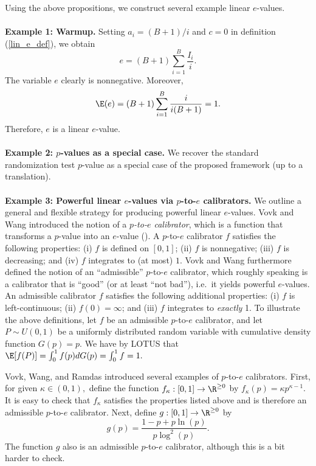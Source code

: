 \documentclass[12pt]{article}
\begin{document}
Using the above propositions, we construct several example linear $e$-values.
\\ \\  \noindent
\textbf{Example 1: Warmup.} Setting $a_i = (B+1)/i$ and $c = 0$ in definition (\ref{lin_e_def}), we obtain
$$e = (B+1)\sum_{i=1}^B \frac{I_i}{i}.$$ The variable $e$ clearly is nonnegative. Moreover, $$ \E(e) = (B+1) \sum_{i=1}^B \frac{ i }{i(B+1)} = 1.$$ Therefore, $e$ is a linear $e$-value.
\\ \\ \noindent
\textbf{Example 2: $p$-values as a special case.} We recover the standard randomization test $p$-value as a special case of the proposed framework (up to a translation).
\\ \\ \noindent
\textbf{Example 3: Powerful linear $e$-values via $p$-to-$e$ calibrators.}  We outline a general and flexible strategy for producing powerful linear $e$-values. Vovk and Wang introduced the notion of a \textit{$p$-to-$e$ calibrator}, which is a function that transforms a $p$-value into an $e$-value (\cite{Vovk2021b}). A $p$-to-$e$ calibrator $f$ satisfies the following properties: (i) $f$ is defined on $[0,1]$; (ii) $f$ is nonnegative; (iii) $f$ is decreasing; and (iv) $f$ integrates to (at most) $1$. Vovk and Wang furthermore defined the notion of an ``admissible'' $p$-to-$e$ calibrator, which roughly speaking is a calibrator that is ``good'' (or at least ``not bad''), i.e.\ it yields powerful $e$-values.  An admissible calibrator $f$ satisfies the following additional properties: (i) $f$ is left-continuous; (ii) $f(0) = \infty$; and (iii) $f$ integrates to \textit{exactly} 1. To illustrate the above definitions, let $f$ be an admissible $p$-to-$e$ calibrator, and let $P \sim U(0,1)$ be a uniformly distributed random variable with cumulative density function $G(p) = p$. We have by LOTUS that $\E[f(P)] = \int_{0}^1 f(p) d G(p) = \int_0^1 f = 1.$ 

Vovk, Wang, and Ramdas introduced several examples of $p$-to-$e$ calibrators. First, for given $\kappa \in (0,1),$ define the function $f_\kappa : [0,1] \to \R^{\geq 0}$ by $f_\kappa(p) = \kappa p^{\kappa-1}$. It is easy to check that $f_\kappa$ satisfies the properties listed above and is therefore an admissible $p$-to-$e$ calibrator. Next, define $g: [0,1] \to \R^{\geq 0}$ by
$$ g(p) = \frac{1 - p + p \ln(p)}{ p \log^2(p)}.$$ The function $g$ also is an admissible $p$-to-$e$ calibrator, although this is a bit harder to check.
\end{document}
